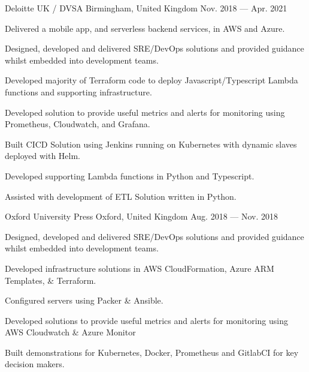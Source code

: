 \begin{cventries}
    {Deloitte UK / DVSA}
    {Birmingham, United Kingdom}
    {Nov. 2018 — Apr. 2021}
    {
        \begin{cvitems}
            \item{Delivered a mobile app, and serverless backend services, in AWS and Azure.}
            \item{Designed, developed and delivered SRE/DevOps solutions and provided guidance whilst embedded into development teams.}
            \item{Developed majority of Terraform code to deploy Javascript/Typescript Lambda functions and supporting infrastructure.}
            \item{Developed solution to provide useful metrics and alerts for monitoring using Prometheus, Cloudwatch, and Grafana.}
            \item{Built CICD Solution using Jenkins running on Kubernetes with dynamic slaves deployed with Helm.}
            \item{Developed supporting Lambda functions in Python and Typescript.}
            \item{Assisted with development of ETL Solution written in Python.}
        \end{cvitems}
    }

    {Oxford University Press}
    {Oxford, United Kingdom}
    {Aug. 2018 — Nov. 2018}
    {
        \begin{cvitems}
            \item{Designed, developed and delivered SRE/DevOps solutions and provided guidance whilst embedded into development teams.}
            \item{Developed infrastructure solutions in AWS CloudFormation, Azure ARM Templates, \& Terraform.}
            \item{Configured servers using Packer \& Ansible.}
            \item{Developed solutions to provide useful metrics and alerts for monitoring using AWS Cloudwatch \& Azure Monitor}
            \item{Built demonstrations for Kubernetes, Docker, Prometheus and GitlabCI for key decision makers.}
        \end{cvitems}
    }
    

\end{cventries}
